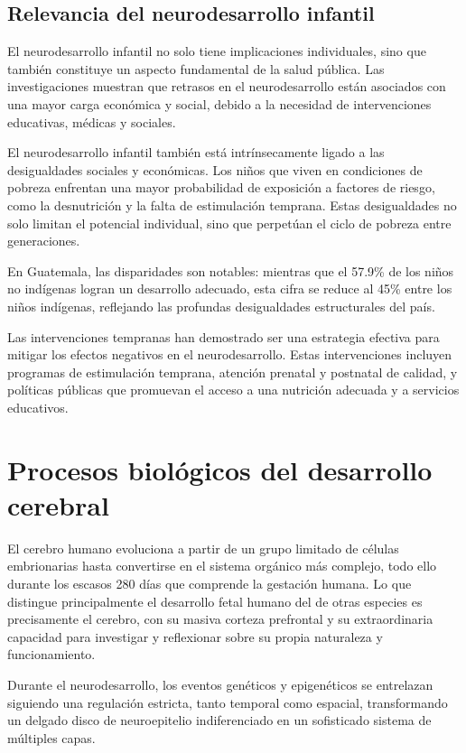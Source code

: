\documentclass[11pt,letterpaper]{report}
\begin{document}
\subsection{Relevancia del neurodesarrollo infantil}
El neurodesarrollo infantil no solo tiene implicaciones individuales, sino que 
también constituye un aspecto fundamental de la salud pública. Las 
investigaciones muestran que retrasos en el neurodesarrollo están asociados 
con una mayor carga económica y social, debido a la necesidad de intervenciones 
educativas, médicas y sociales.

El neurodesarrollo infantil también está intrínsecamente ligado a las 
desigualdades sociales y económicas. Los niños que viven en condiciones de 
pobreza enfrentan una mayor probabilidad de exposición a factores de riesgo, 
como la desnutrición y la falta de estimulación temprana. Estas desigualdades 
no solo limitan el potencial individual, sino que perpetúan el ciclo de pobreza 
entre generaciones. \cite{UNICEF2023}

En Guatemala, las disparidades son notables: mientras que el 57.9\% de los
niños no indígenas logran un desarrollo adecuado, esta cifra se reduce al 45\%
entre los niños indígenas, reflejando las profundas desigualdades estructurales
del país. \cite{SESAN2022}

Las intervenciones tempranas han demostrado ser una estrategia efectiva para 
mitigar los efectos negativos en el neurodesarrollo. Estas intervenciones
incluyen programas de estimulación temprana, atención prenatal y postnatal de
calidad, y políticas públicas que promuevan el acceso a una nutrición adecuada
y a servicios educativos.


\section{Procesos biológicos del desarrollo cerebral}
El cerebro humano evoluciona a partir de un grupo limitado de células
embrionarias hasta convertirse en el sistema orgánico más complejo, todo ello
durante los escasos 280 días que comprende la gestación humana. Lo que 
distingue principalmente el desarrollo fetal humano del de otras especies es 
precisamente el cerebro, con su masiva corteza prefrontal y su extraordinaria 
capacidad para investigar y reflexionar sobre su propia naturaleza y 
funcionamiento. \cite{Polin124}

Durante el neurodesarrollo, los eventos genéticos y epigenéticos se entrelazan 
siguiendo una regulación estricta, tanto temporal como espacial, transformando
un delgado disco de neuroepitelio indiferenciado en un sofisticado sistema de
múltiples capas. \cite{Polin124}
\end{document}

